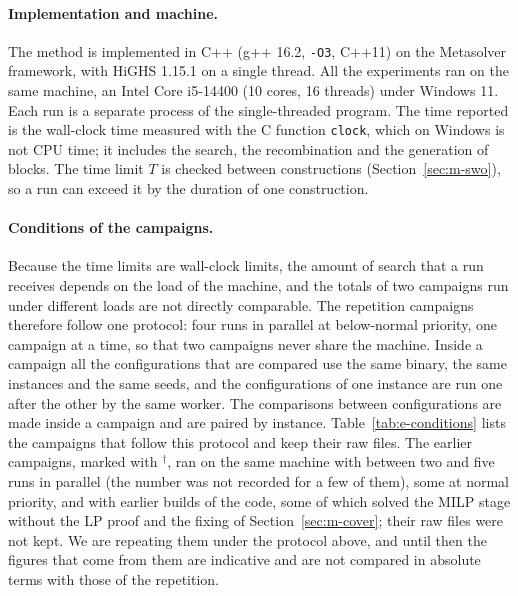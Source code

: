 \paragraph{Implementation and machine.}
The method is implemented in C++ (g++ 16.2, \texttt{-O3}, C++11) on the Metasolver framework,
with HiGHS 1.15.1 \citep{Huangfu2018} on a single thread. All the experiments ran on the same machine,
an Intel Core i5-14400 (10 cores, 16 threads) under Windows 11. Each run is a separate process of the single-threaded
program. The time reported is the wall-clock time measured with the C function
\texttt{clock}, which on Windows is not CPU time; it includes the search, the recombination
and the generation of blocks. The time limit $T$ is checked between constructions
(Section~\ref{sec:m-swo}), so a run can exceed it by the duration of one construction.

\paragraph{Conditions of the campaigns.}
Because the time limits are wall-clock limits, the amount of search that a run receives depends on the load of the machine, and the totals of two campaigns run under different loads
are not directly comparable. The repetition campaigns therefore follow one protocol: four runs in parallel at below-normal priority, one campaign at a time, so that two campaigns never share the machine.
Inside a campaign all the configurations that are compared use the same binary, the same instances and the same seeds, and the configurations of one instance are run one after the other by the same worker.
The comparisons between configurations are made inside a campaign and are paired by instance. Table~\ref{tab:e-conditions} lists the campaigns that follow this protocol and keep their raw files.
The earlier campaigns, marked with $^\dagger$, ran on the same machine with between two and five runs in parallel (the number was not recorded for a few of them), some at normal priority, and with earlier builds of the code,
some of which solved the MILP stage without the LP proof and the fixing of Section~\ref{sec:m-cover}; their raw files were not kept. We are repeating them under the protocol above, and until then the figures that come from them are
indicative and are not compared in absolute terms with those of the repetition.

